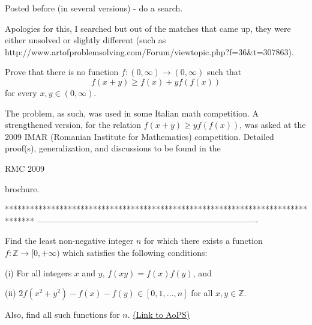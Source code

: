 \begin{solution}
	\begin{tcolorbox}Posted before (in several versions) - do a search.\end{tcolorbox}

Apologies for this, I searched but out of the matches that came up, they were either unsolved or slightly different (such as http://www.artofproblemsolving.com/Forum/viewtopic.php?f=36&t=307863).
\end{solution}



\begin{solution}
	\begin{tcolorbox}Prove that there is no function $f:(0,\infty )\rightarrow (0,\infty)$ such that
\[f(x+y)\ge f(x)+yf(f(x)) \]
for every $x,y\in (0,\infty )$.\end{tcolorbox}
The problem, as such, was used in some Italian math competition. A strengthened version, for the relation $f(x+y)\ge yf(f(x))$, was asked at the 2009 IMAR (Romanian Institute for Mathematics) competition. Detailed proof(s), generalization, and discussions to be found in the \begin{bolded}RMC 2009 \end{bolded}brochure.
\end{solution}
*******************************************************************************
-------------------------------------------------------------------------------

\begin{problem}
	Find the least non-negative integer $n$ for which there exists a function $f : \mathbb Z \to [0, +\infty)$ which satisfies the following conditions:

(i) For all integers $x$ and $y$, $f(xy)=f(x)f(y)$, and

(ii) $2 f(x^2+y^2)-f(x)-f(y) \in [0, 1, \ldots, n]$ for all $x,y \in \mathbb Z$.

Also, find all such functions for $n$.
	\flushright \href{https://artofproblemsolving.com/community/c6h386878}{(Link to AoPS)}
\end{problem}



